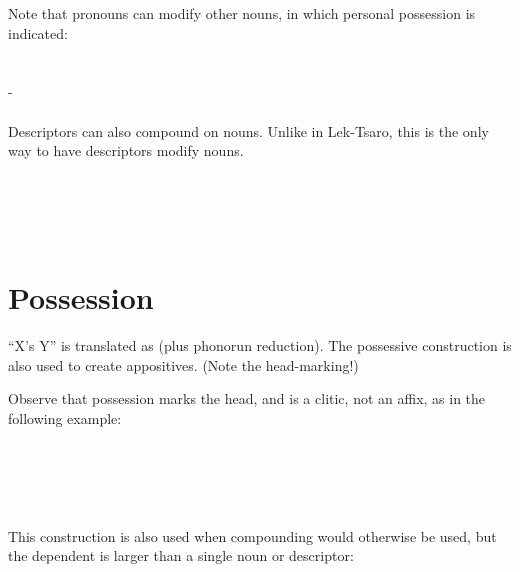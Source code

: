 \documentclass{book}
\begin{document}
Note that pronouns can modify other nouns, in which personal possession is indicated: \\
~\\
 \\
- \\
    \\

Descriptors can also compound on nouns. Unlike in Lek-Tsaro, this is the only way to have descriptors modify nouns. \\
~\\
 \\
 \\
 \\
 

\section{Possession}

``X's Y'' is translated as  (plus phonorun reduction). The possessive construction is also used to create appositives. (Note the head-marking!)

Observe that possession marks the head, and  is a clitic, not an affix, as in the following example: \\
~\\
 \\
 \\
  \\
  \\

This construction is also used when compounding would otherwise be used, but the dependent is larger than a single noun or descriptor: \\
~\\
 \\
    \\
 
\end{document}
